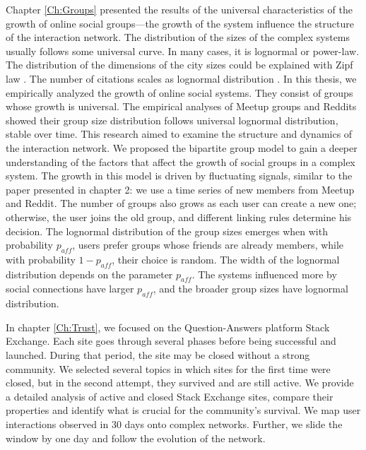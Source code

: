 Chapter \ref{Ch:Groups} presented the results of the universal characteristics of the growth of online social groups—the growth of the system influence the structure of the interaction network. The distribution of the sizes of the complex systems usually follows some universal curve. In many cases, it is lognormal or power-law. The distribution of the dimensions of the city sizes could be explained with Zipf law \cite{gabaix1999}. The number of citations scales as lognormal distribution \cite{radicchi2008}. In this thesis, we empirically analyzed the growth of online social systems. They consist of groups whose growth is universal. The empirical analyses of Meetup groups and Reddits showed their group size distribution follows universal lognormal distribution, stable over time. This research aimed to examine the structure and dynamics of the interaction network. We proposed the bipartite group model to gain a deeper understanding of the factors that affect the growth of social groups in a complex system. The growth in this model is driven by fluctuating signals, similar to the paper presented in chapter 2: we use a time series of new members from Meetup and Reddit. The number of groups also grows as each user can create a new one; otherwise, the user joins the old group, and different linking rules determine his decision. The lognormal distribution of the group sizes emerges when with probability $p_{aff}$, users prefer groups whose friends are already members, while with probability $1-p_{aff}$, their choice is random. The width of the lognormal distribution depends on the parameter $p_{aff}$. The systems influenced more by social connections have larger $p_{aff}$, and the broader group sizes have lognormal distribution.

In chapter \ref{Ch:Trust}, we focused on the Question-Answers platform Stack Exchange. Each site goes through several phases before being successful and launched. During that period, the site may be closed without a strong community. We selected several topics in which sites for the first time were closed, but in the second attempt, they survived and are still active. We provide a detailed analysis of active and closed Stack Exchange sites, compare their properties and identify what is crucial for the community's survival. We map user interactions observed in 30 days onto complex networks. Further, we slide the window by one day and follow the evolution of the network. 

